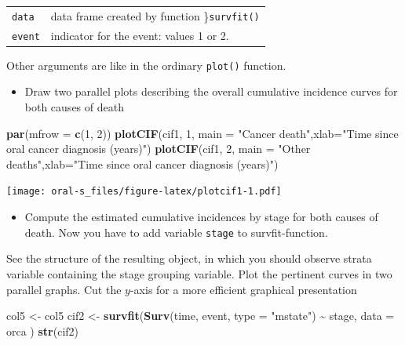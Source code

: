 \documentclass[
]{book}
\newenvironment{Shaded}{\begin{snugshade}}{\end{snugshade}}
\newcommand{\AttributeTok}[1]{\textcolor[rgb]{0.13,0.29,0.53}{#1}}
\newcommand{\DecValTok}[1]{\textcolor[rgb]{0.00,0.00,0.81}{#1}}
\newcommand{\FunctionTok}[1]{\textcolor[rgb]{0.13,0.29,0.53}{\textbf{#1}}}
\newcommand{\NormalTok}[1]{#1}
\newcommand{\OtherTok}[1]{\textcolor[rgb]{0.56,0.35,0.01}{#1}}
\newcommand{\SpecialCharTok}[1]{\textcolor[rgb]{0.81,0.36,0.00}{\textbf{#1}}}
\newcommand{\StringTok}[1]{\textcolor[rgb]{0.31,0.60,0.02}{#1}}
\providecommand{\tightlist}{%
  \setlength{\itemsep}{0pt}\setlength{\parskip}{0pt}}
\begin{document}
\begin{longtable}[]{@{}ll@{}}
\toprule\noalign{}
\endhead
\bottomrule\noalign{}
\endlastfoot
\texttt{data} & data frame created by function \}\texttt{survfit()} \\
\texttt{event} & indicator for the event: values 1 or 2. \\
\end{longtable}

Other arguments are like in the ordinary \texttt{plot()} function.

\begin{itemize}
\tightlist
\item
  Draw two parallel plots describing
  the overall cumulative incidence curves for both causes of death
\end{itemize}

\begin{Shaded}
\begin{Highlighting}[]
\FunctionTok{par}\NormalTok{(}\AttributeTok{mfrow =} \FunctionTok{c}\NormalTok{(}\DecValTok{1}\NormalTok{, }\DecValTok{2}\NormalTok{))}
\FunctionTok{plotCIF}\NormalTok{(cif1, }\DecValTok{1}\NormalTok{, }\AttributeTok{main =} \StringTok{"Cancer death"}\NormalTok{,}\AttributeTok{xlab=}\StringTok{"Time since oral cancer diagnosis (years)"}\NormalTok{)}
\FunctionTok{plotCIF}\NormalTok{(cif1, }\DecValTok{2}\NormalTok{, }\AttributeTok{main =} \StringTok{"Other deaths"}\NormalTok{,}\AttributeTok{xlab=}\StringTok{"Time since oral cancer diagnosis (years)"}\NormalTok{)}
\end{Highlighting}
\end{Shaded}

\texttt{[image: oral-s\_files/figure-latex/plotcif1-1.pdf]}

\begin{itemize}
\tightlist
\item
  Compute the estimated
  cumulative incidences by stage for both causes of death.
  Now you have to add variable \texttt{stage} to survfit-function.
\end{itemize}

See the structure of the resulting object, in which you should
observe strata variable containing the stage grouping variable. Plot the pertinent curves in two parallel graphs.
Cut the \(y\)-axis for a more efficient graphical presentation

\begin{Shaded}
\begin{Highlighting}[]
\NormalTok{col5 }\OtherTok{\textless{}{-}}\NormalTok{ col5}
\NormalTok{cif2 }\OtherTok{\textless{}{-}} \FunctionTok{survfit}\NormalTok{(}\FunctionTok{Surv}\NormalTok{(time, event, }\AttributeTok{type =} \StringTok{"mstate"}\NormalTok{) }\SpecialCharTok{\textasciitilde{}}\NormalTok{ stage,}
  \AttributeTok{data =}\NormalTok{ orca}
\NormalTok{)}
\FunctionTok{str}\NormalTok{(cif2)}
\end{Highlighting}
\end{Shaded}
\end{document}
